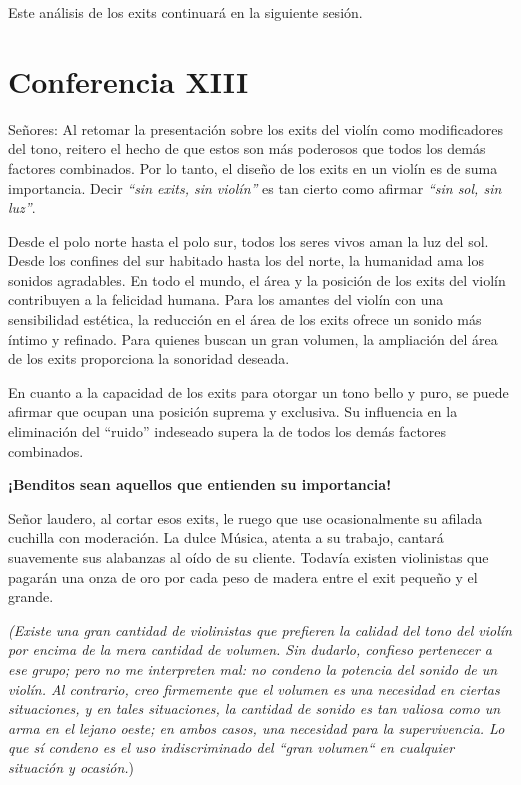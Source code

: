 \documentclass[12pt]{book}
\begin{document}
Este análisis de los exits continuará en la siguiente sesión.

\section*{Conferencia XIII}

Señores: Al retomar la presentación sobre los exits del violín como modificadores del tono, reitero el hecho de que estos son más poderosos que todos los demás factores combinados. Por lo tanto, el diseño de los exits en un violín es de suma importancia. Decir \textit{“sin exits, sin violín”} es tan cierto como afirmar \textit{“sin sol, sin luz”}. 

Desde el polo norte hasta el polo sur, todos los seres vivos aman la luz del sol. Desde los confines del sur habitado hasta los del norte, la humanidad ama los sonidos agradables. En todo el mundo, el área y la posición de los exits del violín contribuyen a la felicidad humana. Para los amantes del violín con una sensibilidad estética, la reducción en el área de los exits ofrece un sonido más íntimo y refinado. Para quienes buscan un gran volumen, la ampliación del área de los exits proporciona la sonoridad deseada.

En cuanto a la capacidad de los exits para otorgar un tono bello y puro, se puede afirmar que ocupan una posición suprema y exclusiva. Su influencia en la eliminación del “ruido” indeseado supera la de todos los demás factores combinados.


\textbf{¡Benditos sean aquellos que entienden su importancia!}  

Señor laudero, al cortar esos exits, le ruego que use ocasionalmente su afilada cuchilla con moderación. La dulce Música, atenta a su trabajo, cantará suavemente sus alabanzas al oído de su cliente. Todavía existen violinistas que pagarán una onza de oro por cada peso de madera entre el exit pequeño y el grande.

\textit{(Existe una gran cantidad de violinistas que prefieren la calidad del tono del violín por encima de la mera cantidad de volumen. Sin dudarlo, confieso pertenecer a ese grupo; pero no me interpreten mal: no condeno la potencia del sonido de un violín. Al contrario, creo firmemente que el volumen es una necesidad en ciertas situaciones, y en tales situaciones, la cantidad de sonido es tan valiosa como un arma en el lejano oeste; en ambos casos, una necesidad para la supervivencia. Lo que sí condeno es el uso indiscriminado del ``gran volumen`` en cualquier situación y ocasión.})  
\end{document}
